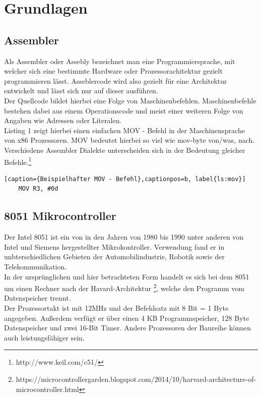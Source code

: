 \documentclass[a4paper,12pt]{article}
\begin{document}
	\newpage
	
	\section{Grundlagen}
	\subsection{Assembler}
	Als Assembler oder Assebly bezeichnet man eine Programmiersprache, mit welcher sich eine bestimmte Hardware oder Prozessorachitektur gezielt programmieren lässt. Asseblercode wird also gezielt für eine Architektur entwickelt und lässt sich nur auf dieser ausführen.\\
	Der Quellcode bildet hierbei eine Folge von Maschinenbefehlen. Maschinenbefehle bestehen dabei aus einem Operationscode und meist einer weiteren Folge von Angaben wie Adressen oder Literalen.\\
	Listing 1 zeigt hierbei einen einfachen MOV - Befehl in  der Maschinensprache von x86 Prozessoren. MOV bedeutet hierbei so viel wie mov-byte von/was, nach. Verschiedene Assembler Dialekte unterscheiden sich in der Bedeutung gleicher Befehle.\footnote{http://www.keil.com/c51/}
	
	 
	\begin{lstlisting}[caption={Beispielhafter MOV - Befehl},captionpos=b, label{ls:mov}]
	MOV R3, #0d
	\end{lstlisting}
	
	\subsection{8051 Mikrocontroller}
	Der Intel 8051 ist ein von in den Jahren von 1980 bis 1990 unter anderen von Intel und Siemens hergestellter Mikrokontroller. Verwendung fand er in unbterschiedlichen Gebieten der Automobilindustrie, Robotik sowie der Telekommunikation.\\
	In der ursprünglichen und hier betrachteten Form handelt es sich bei dem 8051 um einen Rechner nach der Havard-Architektur \footnote{https://microcontrollergarden.blogspot.com/2014/10/harvard-architecture-of-microcontroller.html}, welche den Programm vom Datenspeicher trennt.\\
	Der Prozessortakt ist mit 12MHz und der Befehlsatz mit 8 Bit = 1 Byte angegeben. Außerdem verfügt er über einen 4 KB Programmspeicher, 128 Byte Datenspeicher und zwei 16-Bit Timer. Andere Prozessoren der Baureihe können auch leistungsfähiger sein.\\
	
\end{document}
